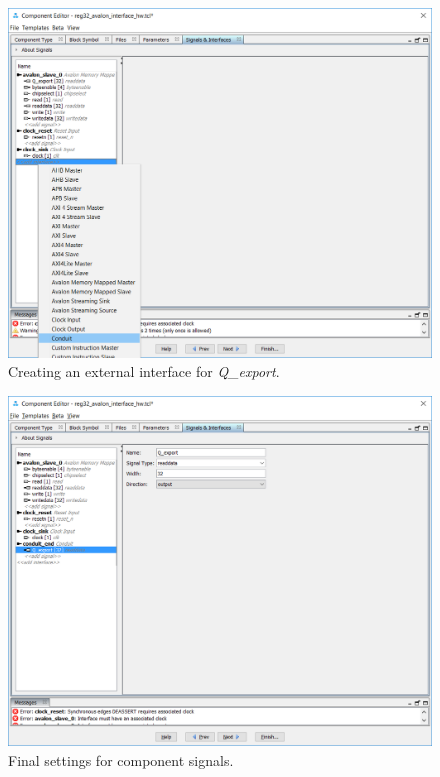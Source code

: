 \documentclass[11pt, twoside, pdftex]{article}
\begin{document}
\begin{figure}[H]
   \begin{center}
        \includegraphics[scale=0.6]{figures/figure20.png}
   \end{center}
   \caption{Creating an external interface for {\it Q\_export}.}
	\label{fig:20}
\end{figure}

\clearpage

\begin{figure}[H]
   \begin{center}
        \includegraphics[scale=0.6]{figures/figure21.png}
   \end{center}
   \caption{Final settings for component signals.}
	\label{fig:21}
\end{figure}
\end{document}
